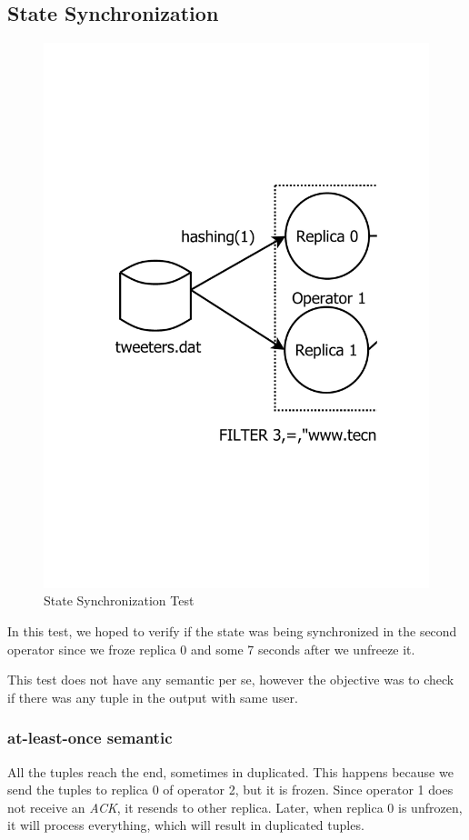 \documentclass[times, 10pt,twocolumn]{article}
\begin{document}
\subsection{State Synchronization}
\begin{figure}[h]
	\centering
	\includegraphics[scale=0.32]{"Tests/first"}
	\caption{State Synchronization Test} 
	\label{fig:state}
\end{figure}
	
In this test, we hoped to verify if the state was being synchronized in the second operator since we froze replica 0 and some 7 seconds after we unfreeze it. 

This test does not have any semantic per se, however the objective was to check if there was any tuple in the output with same user.

\subsubsection{at-least-once semantic}
All the tuples reach the end, sometimes in duplicated. This happens because we send the tuples to replica 0 of operator 2, but it is frozen. Since operator 1 does not receive an \textit{ACK}, it resends to other replica. Later, when replica 0 is unfrozen, it will process everything, which will result in duplicated tuples.
\end{document}
